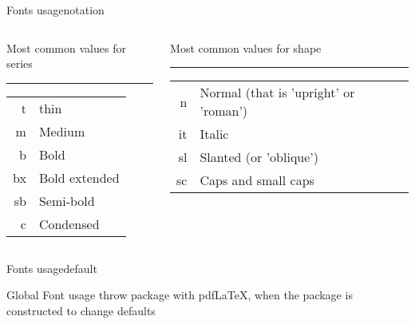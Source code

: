 \begin{frame}[fragile]{Fonts usage\magicPage}{notation}\relax
    \centering
    \begin{columns}[t]
    \begin{column}{0.5\textwidth}
    \centering
    
    Most common values for series\strut\hrule
    
    \begin{tabular}{rl}
         t & thin\\
         m &Medium\\ 
         b &Bold \\
         bx & Bold extended\\ 
         sb &Semi-bold\\ 
         c & Condensed
    \end{tabular}
    \end{column}
    
    \begin{column}{0.5\textwidth}
    
    Most common values for shape\strut\hrule
    
    \begin{tabular}{rl}
    n & Normal \scriptsize(that is 'upright' or 'roman') \\ 
    it & Italic\\  
    sl & Slanted \scriptsize(or 'oblique') \\ 
    sc &Caps and small caps
    \end{tabular}
    \end{column}
         
    \end{columns}
    \cprotect{}
\end{frame}


\begin{frame}[t, fragile]{Fonts usage\magicPage}{default}\relax



\ncol\usepackage{fontenc}

\end{frame}

\begin{frame}

\magicPage
     \centering\huge Global Font usage throw package with pdf\LaTeX, when the package is constructed to change defaults
     
\end{frame}

